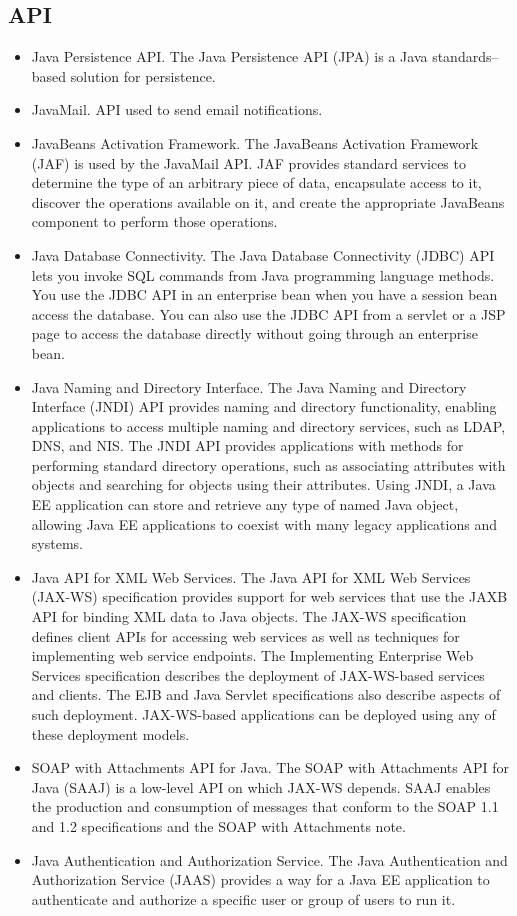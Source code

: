 \documentclass[12pt]{article}
\begin{document}
\subsection*{API}
\begin{itemize}
\item Java Persistence API. The Java Persistence API (JPA) is a Java standards–based solution for persistence.
\item JavaMail. API used to send email notifications.
\item JavaBeans Activation Framework. The JavaBeans Activation Framework (JAF) is used by the JavaMail API. JAF provides standard services to determine the type of an arbitrary piece of data, encapsulate access to it, discover the operations available on it, and create the appropriate JavaBeans component to perform those operations.
\item Java Database Connectivity. The Java Database Connectivity (JDBC) API lets you invoke SQL commands from Java programming language methods. You use the JDBC API in an enterprise bean when you have a session bean access the database. You can also use the JDBC API from a servlet or a JSP page to access the database directly without going through an enterprise bean.
\item Java Naming and Directory Interface. The Java Naming and Directory Interface (JNDI) API provides naming and directory functionality, enabling applications to access multiple naming and directory services, such as LDAP, DNS, and NIS. The JNDI API provides applications with methods for performing standard directory operations, such as associating attributes with objects and searching for objects using their attributes. Using JNDI, a Java EE application can store and retrieve any type of named Java object, allowing Java EE applications to coexist with many legacy applications and systems.
\item Java API for XML Web Services. The Java API for XML Web Services (JAX-WS) specification provides support for web services that use the JAXB API for binding XML data to Java objects. The JAX-WS specification defines client APIs for accessing web services as well as techniques for implementing web service endpoints. The Implementing Enterprise Web Services specification describes the deployment of JAX-WS-based services and clients. The EJB and Java Servlet specifications also describe aspects of such deployment. JAX-WS-based applications can be deployed using any of these deployment models.
\item SOAP with Attachments API for Java. The SOAP with Attachments API for Java (SAAJ) is a low-level API on which JAX-WS depends. SAAJ enables the production and consumption of messages that conform to the SOAP 1.1 and 1.2 specifications and the SOAP with Attachments note.
\item Java Authentication and Authorization Service. The Java Authentication and Authorization Service (JAAS) provides a way for a Java EE application to authenticate and authorize a specific user or group of users to run it.
\end{itemize}
\end{document}
